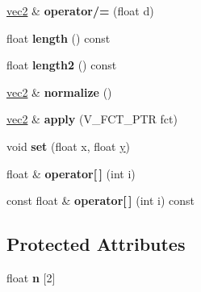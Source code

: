\begin{DoxyCompactItemize}
\item 
\hypertarget{classvec2_aeed76056ef7b692e489212f1c36ff113}{\hyperlink{classvec2}{vec2} \& {\bfseries operator/=} (float d)}\label{classvec2_aeed76056ef7b692e489212f1c36ff113}

\item 
\hypertarget{classvec2_a0858db6efbcc16f47e09de36711988ba}{float {\bfseries length} () const }\label{classvec2_a0858db6efbcc16f47e09de36711988ba}

\item 
\hypertarget{classvec2_a3d77d0f16519820514ce621975253672}{float {\bfseries length2} () const }\label{classvec2_a3d77d0f16519820514ce621975253672}

\item 
\hypertarget{classvec2_a2aa2180a727a575f4844ce5c878a5f55}{\hyperlink{classvec2}{vec2} \& {\bfseries normalize} ()}\label{classvec2_a2aa2180a727a575f4844ce5c878a5f55}

\item 
\hypertarget{classvec2_a83760a59314805cdebf8d5bc87253944}{\hyperlink{classvec2}{vec2} \& {\bfseries apply} (V\+\_\+\+F\+C\+T\+\_\+\+P\+T\+R fct)}\label{classvec2_a83760a59314805cdebf8d5bc87253944}

\item 
\hypertarget{classvec2_a27df9a22ceb4deb3a3d3bb8ad1a25f9c}{void {\bfseries set} (float x, float \hyperlink{_ice_utils_8h_aa7ffaed69623192258fb8679569ff9ba}{y})}\label{classvec2_a27df9a22ceb4deb3a3d3bb8ad1a25f9c}

\item 
\hypertarget{classvec2_a33d77eb8386bd5b7a4ed4b54e5805cb3}{float \& {\bfseries operator\mbox{[}$\,$\mbox{]}} (int i)}\label{classvec2_a33d77eb8386bd5b7a4ed4b54e5805cb3}

\item 
\hypertarget{classvec2_a14de5b60648d9b0c27f63fb9fd7ad560}{const float \& {\bfseries operator\mbox{[}$\,$\mbox{]}} (int i) const }\label{classvec2_a14de5b60648d9b0c27f63fb9fd7ad560}

\end{DoxyCompactItemize}
\subsection*{Protected Attributes}
\begin{DoxyCompactItemize}
\item 
\hypertarget{classvec2_a909babb02077ca16742cdeefc894528a}{float {\bfseries n} \mbox{[}2\mbox{]}}\label{classvec2_a909babb02077ca16742cdeefc894528a}

\end{DoxyCompactItemize}
